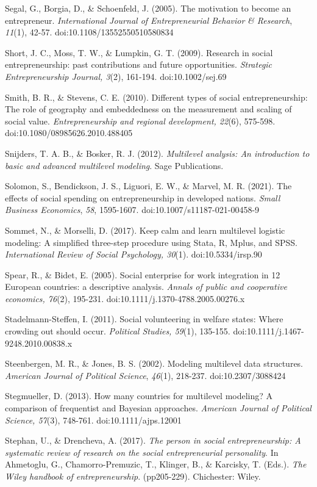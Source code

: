 \documentclass{article}
\begin{document}
Segal, G., Borgia, D., \& Schoenfeld, J. (2005). The motivation to become an entrepreneur. \emph{International Journal of Entrepreneurial }\emph{Behavior}\emph{ \& Research}, \emph{11}(1), 42-57. doi:10.1108/13552550510580834

Short, J. C., Moss, T. W., \& Lumpkin, G. T. (2009). Research in social entrepreneurship: past contributions and future opportunities. \emph{Strategic Entrepreneurship Journal, 3}(2), 161-194. doi:10.1002/sej.69

Smith, B. R., \& Stevens, C. E. (2010). Different types of social entrepreneurship: The role of geography and embeddedness on the measurement and scaling of social value. \emph{Entrepreneurship and regional development, 22}(6), 575-598. doi:10.1080/08985626.2010.488405

Snijders, T. A. B., \& Bosker, R. J. (2012). \emph{Multilevel analysis: An introduction to basic and advanced multilevel }\emph{modeling}. Sage Publications.

Solomon, S., Bendickson, J. S., Liguori, E. W., \& Marvel, M. R. (2021). The effects of social spending on entrepreneurship in developed nations. \emph{Small Business Economics}, \emph{58}, 1595-1607. doi:10.1007/s11187-021-00458-9

Sommet, N., \& Morselli, D. (2017). Keep calm and learn multilevel logistic modeling: A simplified three-step procedure using Stata, R, Mplus, and SPSS. \emph{International Review of Social Psychology, 30}(1). doi:10.5334/irsp.90

Spear, R., \& Bidet, E. (2005). Social enterprise for work integration in 12 European countries: a descriptive analysis. \emph{Annals of public and cooperative economics, 76}(2), 195-231. doi:10.1111/j.1370-4788.2005.00276.x

Stadelmann-Steffen, I. (2011). Social volunteering in welfare states: Where crowding out should occur. \emph{Political Studies, 59}(1), 135-155. doi:10.1111/j.1467-9248.2010.00838.x

Steenbergen, M. R., \& Jones, B. S. (2002). Modeling multilevel data structures. \emph{American Journal of Political Science}, \emph{46}(1), 218-237. doi:10.2307/3088424 

Stegmueller, D. (2013). How many countries for multilevel modeling? A comparison of frequentist and Bayesian approaches. \emph{American Journal of Political Science, 57}(3), 748-761. doi:10.1111/ajps.12001

Stephan, U., \& Drencheva, A. (2017). \emph{The person in social entrepreneurship: A systematic review of research on the social entrepreneurial personality}. In Ahmetoglu, G., Chamorro-Premuzic, T., Klinger, B., \& Karcisky, T. (Eds.). \emph{The Wiley handbook of entrepreneurship}. (pp205-229). Chichester: Wiley. 
\end{document}
